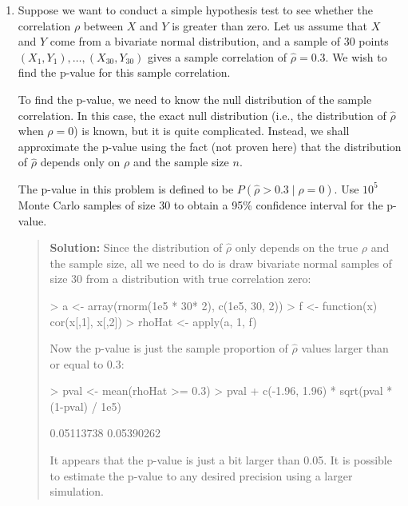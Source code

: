 \documentclass{article}
\begin{document}
\begin{enumerate}
  \item Suppose we want to conduct a simple hypothesis test to see whether the
  correlation $\rho$ between $X$ and $Y$ is greater than zero. Let us assume
  that $X$ and $Y$ come from a bivariate normal distribution, and a sample of 30
  points $(X_1, Y_1), \ldots, (X_{30}, Y_{30})$ gives a sample correlation of
  $\hat\rho=0.3$. We wish to find the p-value for this sample correlation.
  
  To find the p-value, we need to know the null distribution of the sample
  correlation. In this case, the exact null distribution (i.e., the distribution
  of $\hat\rho$ when $\rho=0$) is known, but it is quite complicated. Instead,
  we shall approximate the p-value using the fact (not proven here) that the
  distribution of $\hat\rho$ depends only on $\rho$ and the sample size $n$.

  The p-value in this problem is defined to be $P(\hat\rho>0.3 \mid \rho=0)$.
  Use $10^5$ Monte Carlo samples of size $30$ to obtain a 95\% confidence
  interval for the p-value.
    \begin{quotation}{\bf Solution:}
    Since the distribution of $\hat\rho$ only depends on the true $\rho$
    and the sample size, all we need to do is draw bivariate normal 
    samples of size 30 from a distribution with true correlation zero:
\begin{Schunk}
\begin{Sinput}
> a <- array(rnorm(1e5 * 30* 2), c(1e5, 30, 2))
> f <- function(x) cor(x[,1], x[,2])
> rhoHat <- apply(a, 1, f)
\end{Sinput}
\end{Schunk}
   Now the p-value is just the sample proportion of $\hat\rho$ values
   larger than or equal to $0.3$:
\begin{Schunk}
\begin{Sinput}
> pval <- mean(rhoHat >= 0.3)
> pval + c(-1.96, 1.96) * sqrt(pval * (1-pval) / 1e5)
\end{Sinput}
\begin{Soutput}
[1] 0.05113738 0.05390262
\end{Soutput}
\end{Schunk}
   It appears that the p-value is just a bit larger than 0.05.  It is possible to
   estimate the p-value to any desired precision using a larger simulation.
    \end{quotation}
  

\end{enumerate}
\end{document}
